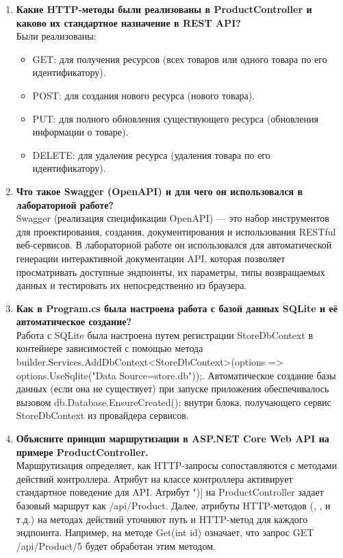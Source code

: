 \documentclass[12pt]{article}
\renewcommand{\texttt}[1]{{\small\ttfamily #1}}
\numberwithin{listing}{section}
\numberwithin{figure}{section}
\begin{document}
\begin{enumerate}
	\item \textbf{Какие HTTP-методы были реализованы в \texttt{ProductController} и каково их стандартное назначение в REST API?} \\
	      Были реализованы:
	      \begin{itemize}
		      \item \texttt{GET}: для получения ресурсов (всех товаров или одного товара по его идентификатору).
		      \item \texttt{POST}: для создания нового ресурса (нового товара).
		      \item \texttt{PUT}: для полного обновления существующего ресурса (обновления информации о товаре).
		      \item \texttt{DELETE}: для удаления ресурса (удаления товара по его идентификатору).
	      \end{itemize}

	\item \textbf{Что такое Swagger (OpenAPI) и для чего он использовался в лабораторной работе?} \\
	      Swagger (реализация спецификации OpenAPI) — это набор инструментов для проектирования, создания, документирования и использования RESTful веб-сервисов. В лабораторной работе он использовался для автоматической генерации интерактивной документации API, которая позволяет просматривать доступные эндпоинты, их параметры, типы возвращаемых данных и тестировать их непосредственно из браузера.

	\item \textbf{Как в \texttt{Program.cs} была настроена работа с базой данных SQLite и её автоматическое создание?} \\
	      Работа с SQLite была настроена путем регистрации \texttt{StoreDbContext} в контейнере зависимостей с помощью метода \texttt{builder.Services.AddDbContext<StoreDbContext>(options => options.Use\-Sqlite("Data Source=store.db"));}. Автоматическое создание базы данных (если она не существует) при запуске приложения обеспечивалось вызовом \texttt{db.Database.Ensure\-Created();} внутри блока, получающего сервис \texttt{StoreDbContext} из провайдера сервисов.

	\item \textbf{Объясните принцип маршрутизации в ASP.NET Core Web API на примере \texttt{Product\-Controller}.} \\
	      Маршрутизация определяет, как HTTP-запросы сопоставляются с методами действий контроллера. Атрибут \texttt{[ApiController]} на классе контроллера активирует стандартное поведение для API. Атрибут \texttt{[Route("api/[controller]")]} на \texttt{ProductController} задает базовый маршрут как \texttt{/api/Product}. Далее, атрибуты HTTP-методов (\texttt{[HttpGet]}, \texttt{[HttpPost]}, \texttt{[HttpGet("{id}")]} и т.д.) на методах действий уточняют путь и HTTP-метод для каждого эндпоинта. Например, \texttt{[HttpGet("{id}")]} на методе \texttt{Get(int id)} означает, что запрос \texttt{GET /api/Pro\-duct/5} будет обработан этим методом.


\end{enumerate}
\end{document}
